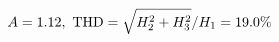 \documentclass[preview]{standalone}
\begin{document}
\begin{align*}
\special{dvisvgm:raw <g id='unique000'>}A=1.12,\ \text{THD}=\sqrt{H_2^2+H_3^2}/H_1=19.0\%\special{dvisvgm:raw </g>}
\end{align*}
\end{document}
